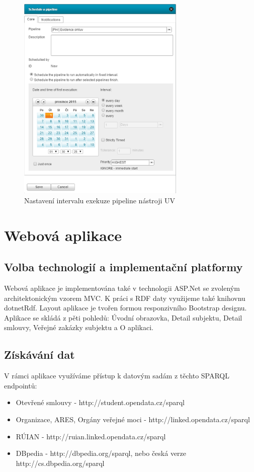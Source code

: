 \begin{figure}[H]
\centerline{\includegraphics[width=80mm]{img/unvSchedule.eps}}
\caption{Nastavení intervalu exekuze pipeline nástroji UV}
\label{obr:unvSchedule}
\end{figure}

\section{Webová aplikace}

\subsection{Volba technologií a implementační platformy}

Webová aplikace je implementována také v technologii ASP.Net se zvoleným architektonickým vzorem MVC. K práci s RDF daty využijeme také knihovnu dotnetRdf. Layout aplikace je tvořen formou responzivního Bootstrap designu. Aplikace se skládá z pěti pohledů: Úvodní obrazovka, Detail subjektu, Detail smlouvy, Veřejné zakázky subjektu a O aplikaci.

\subsection{Získávání dat}

V rámci aplikace využíváme přístup k datovým sadám z těchto SPARQL endpointů:

\begin{itemize}
\item Otevřené smlouvy - http://student.opendata.cz/sparql
\item Organizace, ARES, Orgány veřejné moci - http://linked.opendata.cz/sparql
\item RÚIAN - http://ruian.linked.opendata.cz/sparql
\item DBpedia - http://dbpedia.org/sparql, nebo česká verze http://cs.dbpedia.org/sparql
\end{itemize}

